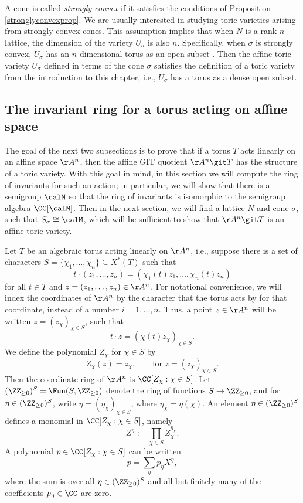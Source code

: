\documentclass[12pt]{amsart}
\theoremstyle{plain}
\begin{document}
A cone is called \emph{strongly convex} if it satisfies the conditions of Proposition \ref{stronglyconvexprop}.
We are usually interested in studying toric varieties arising from strongly convex cones.
This assumption implies that when $N$ is a rank $n$ lattice, the dimension of the variety $U_\sigma$ is also $n$.
Specifically, when $\sigma$ is strongly convex, $U_\sigma$ has an $n$-dimensional torus as an open subset \cite[Theorem 1.2.18]{CLS11}.
Then the affine toric variety $U_\sigma$ defined in terms of the cone $\sigma$ satisfies the definition of a toric variety from the introduction to this chapter, i.e., $U_\sigma$ has a torus as a dense open subset.

\subsection{The invariant ring for a torus acting on affine space}
The goal of the next two subsections is to prove that if a torus $T$ acts linearly on an affine space $\AA^n$, then the affine GIT quotient $\AA^n \git T$ has the structure of a toric variety.
With this goal in mind, in this section we will compute the ring of invariants for such an action;
in particular, we will show that there is a semigroup $\calM$ so that the ring of invariants is isomorphic to the semigroup algebra $\CC[\calM]$.
Then in the next section, we will find a lattice $N$ and cone $\sigma$, such that $S_\sigma \cong \calM$, which will be sufficient to show that $\AA^n \git T$ is an affine toric variety.

Let $T$ be an algebraic torus acting linearly on $\AA^n$, i.e., suppose there is a set of characters $S = \{\chi_1, \ldots, \chi_n\} \subseteq X^*(T)$ such that
$$t \cdot (z_1, \ldots, z_n) = (\chi_1(t) z_1, \ldots, \chi_n(t) z_n)$$
for all $t \in T$ and $z = (z_1, \ldots, z_n) \in \AA^n$.
For notational convenience, we will index the coordinates of $\AA^n$ by the character that the torus acts by for that coordinate, instead of a number $i=1, \ldots, n$.
Thus, a point $z \in \AA^n$ will be written $z = (z_\chi)_{\chi\in S}$, such that
\begin{equation}\label{actiondef}
t \cdot z = (\chi(t) z_\chi)_{\chi \in S}.
\end{equation}
We define the polynomial $Z_\chi$ for $\chi \in S$ by
$$Z_\chi(z) = z_\chi, \qquad \text{for } z = (z_\chi)_{\chi \in S}.$$
Then the coordinate ring of $\AA^n$ is $\CC[Z_\chi : \chi \in S]$.
Let $(\ZZ_{\ge 0})^S = \Fun(S, \ZZ_{\ge 0})$ denote the ring of functions $S \to \ZZ_{\ge 0}$, and for $\eta \in (\ZZ_{\ge 0})^S$, write $\eta=(\eta_\chi)_{\chi\in S}$, where $\eta_\chi = \eta(\chi)$.
An element $\eta \in (\ZZ_{\ge 0})^S$ defines a monomial in $\CC[Z_\chi : \chi \in S]$, namely
$$Z^\eta := \prod_{\chi \in S} Z_\chi^{\eta_\chi}.$$
A polynomial $p \in \CC[Z_\chi : \chi \in S]$ can be written
$$p = \sum_\eta p_\eta X^\eta,$$
where the sum is over all $\eta \in (\ZZ_{\ge 0})^S$ and all but finitely many of the coefficients $p_\eta \in \CC$ are zero.
\end{document}
